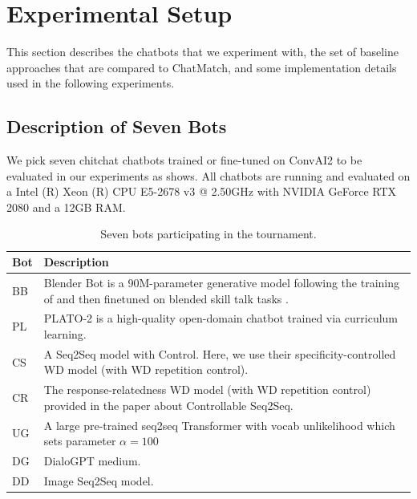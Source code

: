 \section{Experimental Setup}
\label{sec:experiment}
This section describes the chatbots that we experiment with, the
set of baseline approaches that are compared to ChatMatch, and some
implementation details used in the following experiments.

\subsection{Description of Seven Bots}
We pick seven chitchat chatbots trained or fine-tuned on ConvAI2 \citep{dinan2019second} to be evaluated in our experiments 
as  shows.
All chatbots are running and evaluated on a Intel (R) Xeon (R) CPU 
E5-2678 v3 @ 2.50GHz with NVIDIA GeForce RTX 2080 and a 12GB RAM. 

\begin{table}[th]
\centering
\scriptsize
\begin{tabular}{p{}|p{}}
\toprule
\textbf{Bot} & \textbf{Description} \\ \midrule
BB & Blender Bot \citep{roller2020recipes} is a
90M-parameter generative model following the training
of \citet{shuster2020dialogue} and then finetuned on
blended skill talk tasks \cite{smith2020together}.\\ \hline
 PL & PLATO-2 \citep{bao2020plato} is a high-quality open-domain chatbot trained via curriculum learning.\\ \hline
 CS & A Seq2Seq model with Control.  \citep{see2019makes} Here, we use their
specificity-controlled WD model (with WD repetition control).\\ \hline
CR & The response-relatedness WD model
(with WD repetition control) provided in the paper about
Controllable Seq2Seq. \citep{see2019makes} \\ \hline
UG & A large pre-trained seq2seq Transformer
with vocab unlikelihood which sets parameter
$\alpha = 100$ \citep{li2020dont} \\ \hline
DG & DialoGPT medium. \citep{zhang2020dialogpt}\\ \hline
 DD & Image Seq2Seq model. \citep{shuster2020dialogue} \\
\bottomrule
\end{tabular}
\caption{Seven bots participating in the tournament.}
\label{tab:bots}
\end{table}


